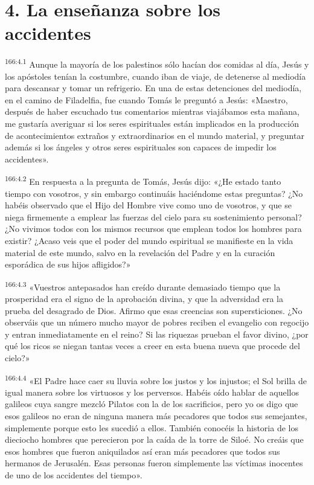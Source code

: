\section*{4. La enseñanza sobre los accidentes}
\par 
\textsuperscript{166:4.1} Aunque la mayoría de los palestinos sólo hacían dos comidas al día, Jesús y los apóstoles tenían la costumbre, cuando iban de viaje, de detenerse al mediodía para descansar y tomar un refrigerio. En una de estas detenciones del mediodía, en el camino de Filadelfia, fue cuando Tomás le preguntó a Jesús: «Maestro, después de haber escuchado tus comentarios mientras viajábamos esta mañana, me gustaría averiguar si los seres espirituales están implicados en la producción de acontecimientos extraños y extraordinarios en el mundo material, y preguntar además si los ángeles y otros seres espirituales son capaces de impedir los accidentes».

\par 
\textsuperscript{166:4.2} En respuesta a la pregunta de Tomás, Jesús dijo: «¿He estado tanto tiempo con vosotros, y sin embargo continuáis haciéndome estas preguntas? ¿No habéis observado que el Hijo del Hombre vive como uno de vosotros, y que se niega firmemente a emplear las fuerzas del cielo para su sostenimiento personal? ¿No vivimos todos con los mismos recursos que emplean todos los hombres para existir? ¿Acaso veis que el poder del mundo espiritual se manifieste en la vida material de este mundo, salvo en la revelación del Padre y en la curación esporádica de sus hijos afligidos?»

\par 
\textsuperscript{166:4.3} «Vuestros antepasados han creído durante demasiado tiempo que la prosperidad era el signo de la aprobación divina, y que la adversidad era la prueba del desagrado de Dios. Afirmo que esas creencias son supersticiones. ¿No observáis que un número mucho mayor de pobres reciben el evangelio con regocijo y entran inmediatamente en el reino? Si las riquezas prueban el favor divino, ¿por qué los ricos se niegan tantas veces a creer en esta buena nueva que procede del cielo?»

\par 
\textsuperscript{166:4.4} «El Padre hace caer su lluvia sobre los justos y los injustos; el Sol brilla de igual manera sobre los virtuosos y los perversos. Habéis oído hablar de aquellos galileos cuya sangre mezcló Pilatos con la de los sacrificios, pero yo os digo que esos galileos no eran de ninguna manera más pecadores que todos sus semejantes, simplemente porque esto les sucedió a ellos. También conocéis la historia de los dieciocho hombres que perecieron por la caída de la torre de Siloé. No creáis que esos hombres que fueron aniquilados así eran más pecadores que todos sus hermanos de Jerusalén. Esas personas fueron simplemente las víctimas inocentes de uno de los accidentes del tiempo».

